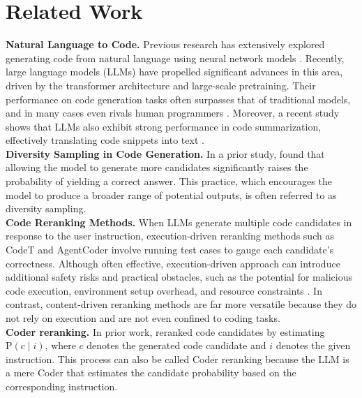 \section{Related Work}
\label{sec:background}
\textbf{Natural Language to Code.} 
Previous research has extensively explored generating code from natural language using neural network models \citep{ling2016latent,rabinovich2017abstract,hayati2018retrieval}. Recently, large language models (LLMs) have propelled significant advances in this area, driven by the transformer \cite{vaswani2017attention} architecture and large-scale pretraining. Their performance on code generation tasks often surpasses that of traditional models, and in many cases even rivals human programmers \citep{ni2024l2ceval,becker2023programming}. Moreover, a recent study shows that LLMs also exhibit strong performance in code summarization, effectively translating code snippets into text \citep{akib2024analysis}.\\

\noindent\textbf{Diversity Sampling in Code Generation.} In a prior study, \citet{chen2021evaluatinglargelanguagemodels} found  that allowing the model to generate more candidates significantly raises the probability of yielding a correct answer. This practice, which encourages the model to produce a broader range of potential outputs, is often referred to as diversity sampling.\\

\noindent\textbf{Code Reranking Methods.} When LLMs generate multiple code candidates in response to the user instruction, execution-driven reranking methods 
such as CodeT \citep{chen2022codetcodegenerationgenerated} and AgentCoder \citep{huang2024agentcodermultiagentbasedcodegeneration} involve running test cases to gauge each candidate’s correctness. Although often effective, execution-driven approach can introduce additional safety risks and practical obstacles, such as the potential for malicious code execution, environment setup overhead, and resource constraints \citep{yeticstiren2023evaluating,khoury2023secure}. In contrast, content-driven reranking methods are far more versatile because they do not rely on execution and are not even confined to coding tasks.\\

\noindent\textbf{Coder reranking.} In prior work, \citet{chen2021evaluatinglargelanguagemodels} reranked code candidates by estimating \(\text{P}(c \mid i) \), where \( c \) denotes the generated code candidate and \( i \) denotes the given instruction. This process can also be called Coder reranking because the LLM is a mere Coder that estimates the candidate probability based on the corresponding instruction.

